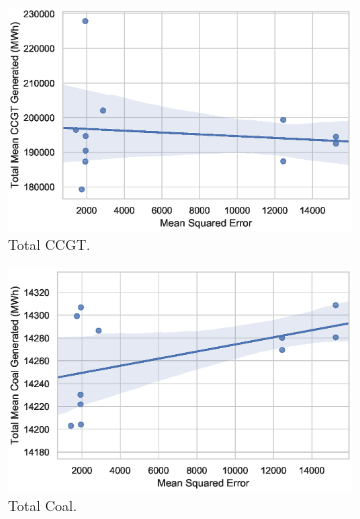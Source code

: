 \begin{figure}[h!]
\centering
\begin{subfigure}[b]{0.3\textwidth}
\includegraphics[width=\columnwidth]{Chapter5/figures/market-forecasting/results/elecsim_results/results_2/total_CCGT_mean_output.eps}
\caption{Total CCGT.}
\label{fig:total_CCGT_mean_output}
\end{subfigure}
\hfil
\begin{subfigure}[b]{0.3\textwidth}  
\includegraphics[width=\columnwidth]{Chapter5/figures/market-forecasting/results/elecsim_results/results_2/total_Coal_mean_output.eps}
\caption{Total Coal.}
\label{fig:total_Coal_mean_output}
\end{subfigure}
\hfil
\begin{subfigure}[b]{0.3\textwidth}   

\end{subfigure}
\end{figure}
